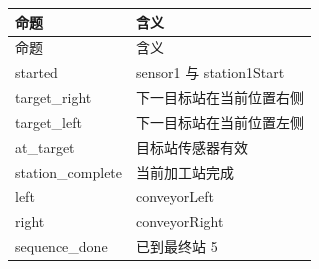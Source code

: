 \begin{longtable}{L{3.3cm}L{10.0cm}}

\toprule

命题 & 含义\\

\midrule

\endfirsthead

\toprule

命题 & 含义\\

\midrule

\endhead

{\ttfamily started} & sensor1 与 station1Start\\

{\ttfamily target\_right} & 下一目标站在当前位置右侧\\

{\ttfamily target\_left} & 下一目标站在当前位置左侧\\

{\ttfamily at\_target} & 目标站传感器有效\\

{\ttfamily station\_complete} & 当前加工站完成\\

{\ttfamily left} & conveyorLeft\\

{\ttfamily right} & conveyorRight\\

{\ttfamily sequence\_done} & 已到最终站 5\\

\bottomrule

\end{longtable}

